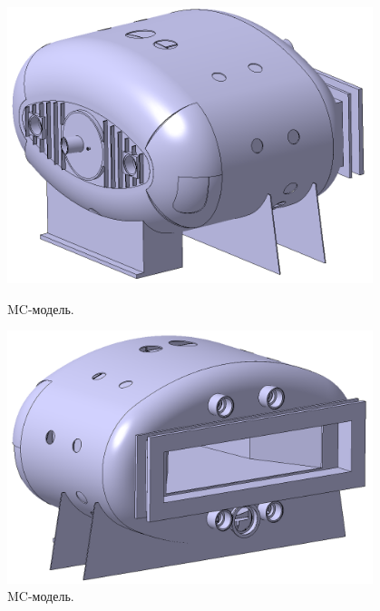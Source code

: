 \begin{figure}[H]
\begin{minipage}[b]{0.495\textwidth}
\includegraphics[width=0.95\textwidth]{pictures/GLAD1.png}
\caption{MC-модель.}
\label{fig:GLAD1}
\end{minipage}
\hspace{0.01\textwidth}
\begin{minipage}[b]{0.495\textwidth}
\includegraphics[width=0.95\textwidth]{pictures/GLAD2.png}
\caption{MC-модель.}
\label{fig:GLAD2}
\end{minipage}


\end{figure}
